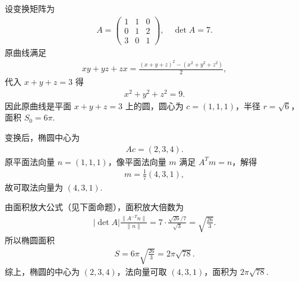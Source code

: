 \documentclass[../../main.tex]{subfiles}%
\begin{document}
\begin{solution}
设变换矩阵为
\begin{align}
A=\begin{pmatrix}
1&1&0\\
0&1&2\\
3&0&1
\end{pmatrix},
\quad \det A=7.\label{eq:detA}
\end{align}
原曲线满足
\begin{align}
xy+yz+zx=\frac{(x+y+z)^2-(x^2+y^2+z^2)}2,
\end{align}
代入 $x+y+z=3$ 得
\begin{align}
x^2+y^2+z^2=9.
\end{align}
因此原曲线是平面 $x+y+z=3$ 上的圆，圆心为 $c=(1,1,1)$，半径 $r=\sqrt{6}$，面积 $S_0=6\pi$.

变换后，椭圆中心为
\begin{align}
Ac=(2,3,4).
\end{align}
原平面法向量 $n=(1,1,1)$，像平面法向量 $m$ 满足 $A^T m=n$，解得
\begin{align}
m=\frac17(4,3,1),
\end{align}
故可取法向量为 $(4,3,1)$.

由面积放大公式（见下面命题），面积放大倍数为
\begin{align}
|\det A|\frac{\|A^{-T}n\|}{\|n\|}
=7\cdot \frac{\sqrt{26}/7}{\sqrt3}
=\sqrt{\frac{26}{3}}.
\end{align}
所以椭圆面积
\begin{align}
S=6\pi\sqrt{\frac{26}{3}}=2\pi\sqrt{78}.
\end{align}
综上，椭圆的中心为 $(2,3,4)$，法向量可取 $(4,3,1)$，面积为 $2\pi\sqrt{78}$.
\end{solution}
\end{document}
